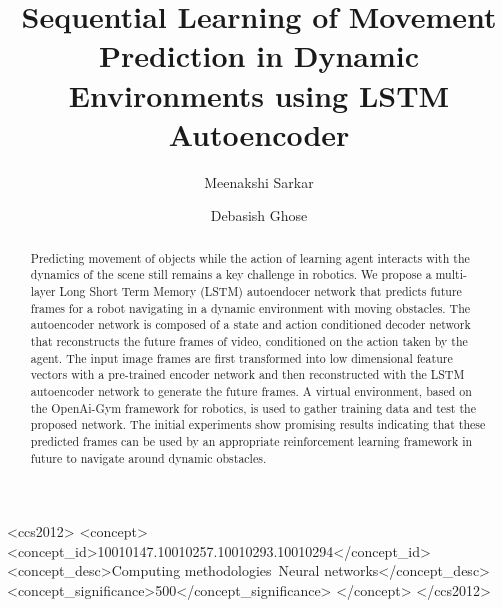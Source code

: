 \documentclass[sigconf]{acmart}
\begin{document}
\title{Sequential Learning of Movement Prediction in Dynamic Environments using LSTM Autoencoder}


\author{Meenakshi Sarkar}

\author{Debasish Ghose}



\begin{abstract}
Predicting movement of objects while the action of learning agent interacts with the dynamics of the scene still remains a key challenge in robotics. We propose a multi-layer Long Short Term Memory (LSTM) autoendocer network that predicts future frames for a robot navigating in a dynamic environment with moving obstacles. The autoencoder network is composed of a state and action conditioned decoder network that reconstructs the future frames of video, conditioned on the action taken by the agent. The input image frames  are first transformed into low dimensional feature vectors with a pre-trained encoder network and then reconstructed with the LSTM autoencoder network to generate the future frames. A virtual environment, based on the OpenAi-Gym framework for robotics, is used to gather training data and test the proposed network. The initial experiments show promising results indicating that these predicted frames can be used by an appropriate reinforcement learning framework in future to navigate around dynamic obstacles.
\end{abstract}
 \begin{CCSXML}
<ccs2012>
<concept>
<concept_id>10010147.10010257.10010293.10010294</concept_id>
<concept_desc>Computing methodologies~Neural networks</concept_desc>
<concept_significance>500</concept_significance>
</concept>
</ccs2012>
\end{CCSXML}






\maketitle
\end{document}
